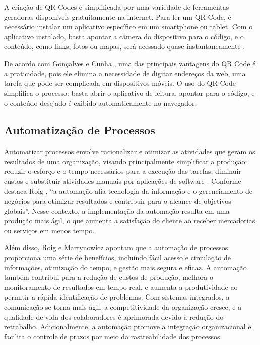 A criação de QR Codes é simplificada por uma variedade de ferramentas geradoras disponíveis gratuitamente na internet. Para ler um QR Code, é necessário instalar um aplicativo específico em um smartphone ou tablet. Com o aplicativo instalado, basta apontar a câmera do dispositivo para o código, e o conteúdo, como links, fotos ou mapas, será acessado quase instantaneamente \cite{bernardo2011}.

De acordo com Gonçalves e Cunha \cite{goncalves2014}, uma das principais vantagens do QR Code é a praticidade, pois ele elimina a necessidade de digitar endereços da web, uma tarefa que pode ser complicada em dispositivos móveis. O uso do QR Code simplifica o processo: basta abrir o aplicativo de leitura, apontar para o código, e o conteúdo desejado é exibido automaticamente no navegador.

\subsection{Automatização de Processos}
Automatizar processos envolve racionalizar e otimizar as atividades que geram os resultados de uma organização, visando principalmente simplificar a produção: reduzir o esforço e o tempo necessários para a execução das tarefas, diminuir custos e substituir atividades manuais por aplicações de software \cite{roig2017}. Conforme destaca Roig \cite{roig2017}, “a automação alia tecnologia da informação e o gerenciamento de negócios para otimizar resultados e contribuir para o alcance de objetivos globais”. Nesse contexto, a implementação da automação resulta em uma produção mais ágil, o que aumenta a satisfação do cliente ao receber mercadorias ou serviços em menos tempo.

Além disso, Roig \cite{roig2017} e Martynowicz \cite{martynowicz2018} apontam que a automação de processos proporciona uma série de benefícios, incluindo fácil acesso e circulação de informações, otimização do tempo, e gestão mais segura e eficaz. A automação também contribui para a redução de custos de produção, melhora o monitoramento de resultados em tempo real, e aumenta a produtividade ao permitir a rápida identificação de problemas. Com sistemas integrados, a comunicação se torna mais ágil, a competitividade da organização cresce, e a qualidade de vida dos colaboradores é aprimorada devido à redução do retrabalho. Adicionalmente, a automação promove a integração organizacional e facilita o controle de prazos por meio da rastreabilidade dos processos.

